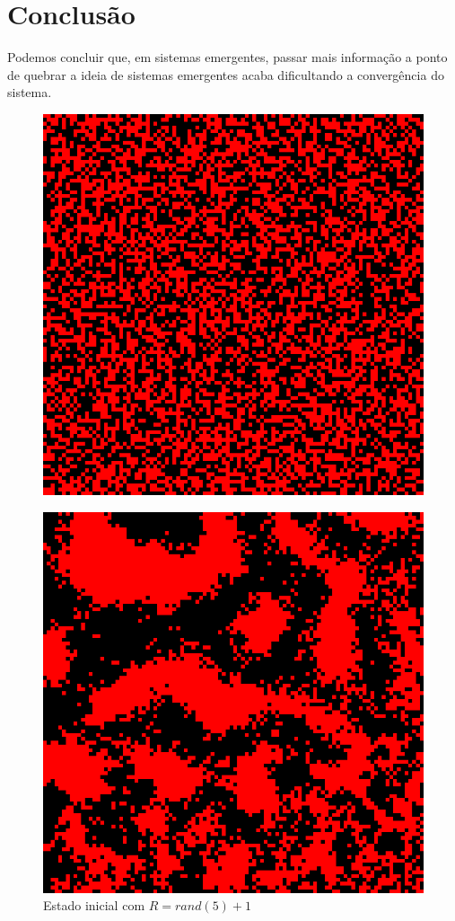 \documentclass[conference]{IEEEtran}
\begin{document}
\section{Conclusão}

Podemos concluir que, em sistemas emergentes, passar mais informação a ponto de quebrar a ideia de sistemas emergentes acaba dificultando a convergência do sistema.

\begin{figure}[H] 
  \begin{minipage}[b]{0.5\linewidth}
    \label{fig:r_rand}
    \centering
    \includegraphics[width=.8\linewidth]{resultados/5-0-rand.png} 
    \caption{Estado inicial com $R=rand(5)+1$} 
    \vspace{4ex}
  \end{minipage}%
  \begin{minipage}[b]{0.5\linewidth}
    \centering
    \includegraphics[width=.8\linewidth]{resultados/5-1-rand.png} 

\end{minipage}
\end{figure}
\end{document}
